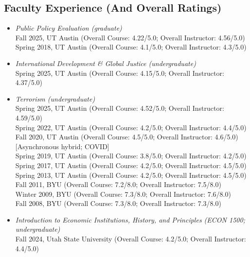 \documentclass[10pt]{article}
\begin{document}
\subsection*{Faculty Experience (And Overall Ratings)}
\begin{itemize}\setlength{\itemsep}{1pt}

\item \textit{Public Policy Evaluation (graduate)}
\\ \indent Fall 2025, UT Austin (Overall Course: 4.22/5.0; Overall Instructor: 4.56/5.0)
\\ \indent Spring 2018, UT Austin (Overall Course: 4.1/5.0; Overall Instructor: 4.3/5.0)

\item \textit{International Development \& Global Justice (undergraduate)}
\\ \indent Spring 2025, UT Austin (Overall Course: 4.15/5.0; Overall Instructor: 4.37/5.0)

\item \textit{Terrorism (undergraduate)}
\\ \indent Spring 2025, UT Austin (Overall Course: 4.52/5.0; Overall Instructor: 4.59/5.0)
\\ \indent Spring 2022, UT Austin (Overall Course: 4.2/5.0; Overall Instructor: 4.4/5.0)
\\ \indent Fall 2020, UT Austin (Overall Course: 4.5/5.0; Overall Instructor: 4.6/5.0) [Asynchronous hybrid; COVID]
\\ \indent Spring 2019, UT Austin (Overall Course: 3.8/5.0; Overall Instructor: 4.2/5.0)
\\ \indent Spring 2017, UT Austin (Overall Course: 4.2/5.0; Overall Instructor: 4.5/5.0)
\\ \indent Spring 2013, UT Austin (Overall Course: 4.2/5.0; Overall Instructor: 4.5/5.0)
\\ \indent Fall 2011, BYU  (Overall Course: 7.2/8.0; Overall Instructor: 7.5/8.0) 
\\ \indent Winter 2009, BYU (Overall Course: 7.3/8.0; Overall Instructor: 7.6/8.0)
\\ \indent Fall 2008, BYU (Overall Course: 7.3/8.0; Overall Instructor: 7.3/8.0) 


\item \textit{Introduction to Economic Institutions, History, and Principles (ECON 1500; undergraduate)}
\\ \indent Fall 2024, Utah State University (Overall Course: 4.2/5.0; Overall Instructor: 4.4/5.0)


\end{itemize}
\end{document}
